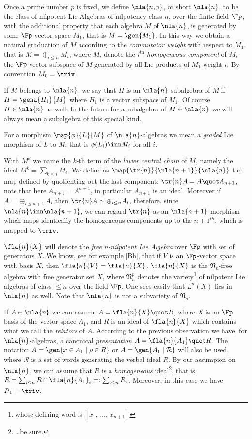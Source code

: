 Once a prime number $p$ is fixed, we define $\nla{n,p}$, or
short $\nla{n}$, to be the class of nilpotent Lie Algebras of nilpotency class $n$,
over the finite field $\Fp$,
with the additional property that each algebra $M$ of $\nla{n}$,
is generated by some $\Fp$-vector space $M_{1}$, that is $M=\gen{M_{1}}$.
In this way we obtain a natural graduation of $M$ according to the \emph{commutator weight} with respect to
$M_{1}$, that is
$M=\oplus_{i\leq n}M_{i}$, where $M_{i}$ denote the $i^{\mathrm{th}}$-\emph{homogeneous component}
of $M$, the $\Fp$-vector subspace of $M$ generated by all Lie products of $M_{1}$-weight $i$. By convention $M_{0}=\triv$.

If $M$ belongs to $\nla{n}$, we say that $H$ is an $\nla{n}$-subalgebra
of $M$ if $H=\gena{H_{1}}{M}$ where $H_{1}$ is a vector
subspace of $M_{1}$. Of course $H\in\nla{n}$ as well.
In the future for a subalgebra of $M\in\nla{n}$ we will
always mean a subalgebra of this special kind.

For a morphism $\map{\phi}{L}{M}$ of $\nla{n}$-algebras we mean a \emph{graded} Lie morphism of $L$ to $M$, that
is $\phi(L_{i})\inn M_{i}$ for all $i$.

With $M^k$ we name the $k$-th term of the \emph{lower central chain} of $M$, namely the ideal
$M^k=\sum_{k\leq i}M_i$.
We define as $\map{\tr{n}}{\nla{n+1}}{\nla{n}}$ the map defined by quotienting out the last component:
$\tr{n}A=A\quot A_{n+1}$, note that here $A_{n+1}=A^{n+1}$, in particular $A_{n+1}$ is an ideal.
Moreover if $A=\oplus_{i\leq n+1}A_{i}$ then $\tr{n}A\simeq\oplus_{i\leq n}A_{i}$, therefore, since $\nla{n}\inn\nla{n+1}$, we can regard $\tr{n}$ as an $\nla{n+1}$ morphism which maps identically the homogeneous components up to the $n+1^{th}$,
which is mapped to $\triv$. 

\medskip
$\fla{n}{X}$ will denote the \emph{free $n$-nilpotent Lie Algebra} over $\Fp$ with set of generators $X$.
We know, see for example [Bh], that if $V$ is an $\Fp$-vector space with basis $X$, then $\fla{n}{V}=\fla{n}{X}$. $\fla{n}{X}$ is the $\mathfrak{N}_{n}$-free algebra with free generator set $X$, where $\mathfrak{N}_{n}^{p}$ denotes the variety\footnote{
whose defining word is $[x_{1},\,\dots,\,x_{n+1}]$}
of nilpotent Lie algebras of class $\leq n$ over the field $\Fp$. One sees easily that $L^{n}(X)$ lies in $\nla{n}$ as well. Note that $\nla{n}$ is not a subvariety of $\mathfrak{N}_{n}$.

\bigskip
If $A\in\nla{n}$ we can assume $A=\fla{n}{X}\quot R$, where $X$ is an $\Fp$ basis of the vector space $A_1$,
and $R$ is an ideal of $\fla{n}{X}$ which contains what we call the \emph{relators} of $A$.
According to the previous observation we have, for $\nla{n}$-algebras, a canonical \emph{presentation} $A=\fla{n}{A_{1}}\quot
R$. The notation $A=\gen{x\in A_{1}\mid \rho\in R}$ or $A=\gen{A_{1}\mid\mathcal{R}}$ will also be used, where $\mathcal{R}$ is a set of words generating the verbal ideal $R$.
By our assumpion on $\nla{n}$, we can assume that $R$ is
a \emph{homogeneous} ideal\footnote{\dots be sure.},
that is $R=\sum_{i\leq n}R\cap{\fla{n}{A_{1}}}_{i}=:\sum_{i\leq n}R_{i}$. Moreover, in this case we have $R_{1}=\triv$.

